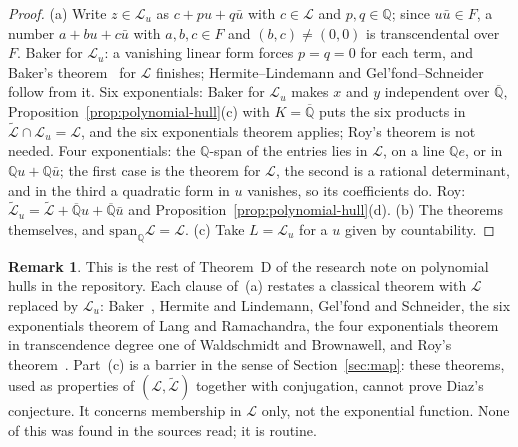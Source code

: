 \documentclass[11pt,a4paper]{article}
\theoremstyle{plain}
\theoremstyle{definition}
\newtheorem{remark}[theorem]{Remark}
\newcommand{\Q}{\mathbb{Q}}
\newcommand{\Alg}{\overline{\mathbb{Q}}}
\newcommand{\Logs}{\mathcal{L}}
\newcommand{\aLogs}{\widetilde{\mathcal{L}}}
\begin{document}
\begin{proof}
(a) Write $z\in\Logs_{u}$ as $c+pu+q\bar u$ with $c\in\Logs$ and $p,q\in\Q$; since $u\bar u\in F$, a number $a+bu+c\bar u$
with $a,b,c\in F$ and $(b,c)\neq(0,0)$ is transcendental over $F$. Baker for $\Logs_{u}$: a vanishing linear form forces
$p=q=0$ for each term, and Baker's theorem~\cite{baker-1966} for $\Logs$ finishes; Hermite--Lindemann and
Gel'fond--Schneider follow from it. Six exponentials: Baker for $\Logs_{u}$ makes $x$ and $y$ independent over $\Alg$,
Proposition~\ref{prop:polynomial-hull}(c) with $K=\Alg$ puts the six products in $\aLogs\cap\Logs_{u}=\Logs$, and the
six exponentials theorem applies; Roy's theorem is not needed. Four exponentials: the $\Q$-span of the entries lies in
$\Logs$, on a line $\Q e$, or in $\Q u+\Q\bar u$; the first case is the theorem for $\Logs$, the second is a rational
determinant, and in the third a quadratic form in $u$ vanishes, so its coefficients do. Roy: $\aLogs_{u}=\aLogs+\Alg u+
\Alg\bar u$ and Proposition~\ref{prop:polynomial-hull}(d). (b) The theorems themselves, and $\mathrm{span}_{\Q}\Logs=\Logs$.
(c) Take $L=\Logs_{u}$ for a $u$ given by countability.
\end{proof}

\begin{remark}\label{rem:theorem-D-credit}
This is the rest of Theorem~D of the research note on polynomial hulls in the repository. Each clause of~(a) restates a
classical theorem with $\Logs$ replaced by $\Logs_{u}$: Baker~\cite{baker-1966}, Hermite and Lindemann, Gel'fond and
Schneider, the six exponentials theorem of Lang and Ramachandra, the four exponentials theorem in transcendence degree
one of Waldschmidt and Brownawell, and Roy's theorem~\cite{roy-1992}. Part~(c) is a barrier in the sense of
Section~\ref{sec:map}: these theorems, used as properties of $(\Logs,\aLogs)$ together with conjugation, cannot prove
Diaz's conjecture. It concerns membership in $\Logs$ only, not the exponential function. None of this was found in the
sources read; it is routine.
\end{remark}
\end{document}
